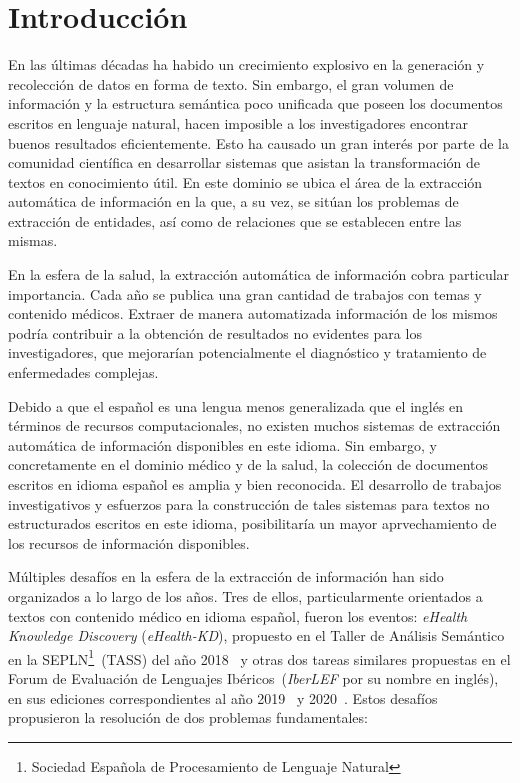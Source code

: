 \chapter*{Introducción}\label{chapter:introduction}

En las últimas décadas ha habido un crecimiento explosivo en la generación y recolección de datos en forma de texto.
Sin embargo, el gran volumen de información y la estructura semántica poco unificada que poseen los documentos escritos en lenguaje natural, hacen imposible a los investigadores encontrar buenos resultados eficientemente.
Esto ha causado un gran interés por parte de la comunidad científica en desarrollar sistemas que asistan la transformación de textos en conocimiento útil.
En este dominio se ubica el área de la extracción automática de información en la que, a su vez, se sitúan los problemas de extracción de entidades, así como de relaciones que se establecen entre las mismas.

En la esfera de la salud, la extracción automática de información cobra particular importancia.
Cada año se publica una gran cantidad de trabajos con temas y contenido médicos.
Extraer de manera automatizada información de los mismos podría contribuir a la obtención de resultados no evidentes para los investigadores, que mejorarían potencialmente el diagnóstico y tratamiento de enfermedades complejas.

Debido a que el español es una lengua menos generalizada que el inglés en términos de recursos computacionales, no existen muchos sistemas de extracción automática de información disponibles en este idioma.
Sin embargo, y concretamente en el dominio médico y de la salud, la colección de documentos escritos en idioma español es amplia y bien reconocida.
El desarrollo de trabajos investigativos y esfuerzos para la construcción de tales sistemas para textos no estructurados escritos en este idioma, posibilitaría un mayor aprvechamiento de los recursos de información disponibles.

Múltiples desafíos en la esfera de la extracción de información han sido organizados a lo largo de los años.
Tres de ellos, particularmente orientados a textos con contenido médico en idioma español, fueron los eventos: \emph{eHealth Knowledge Discovery} (\textit{eHealth-KD}), propuesto en el Taller de Análisis Semántico en la SEPLN\footnote{Sociedad Española de Procesamiento de Lenguaje Natural}~(TASS) del año 2018~\cite{martinez2018overview} y otras dos tareas similares propuestas en el Forum de Evaluación de Lenguajes Ibéricos~(\textit{IberLEF} por su nombre en inglés), en sus ediciones correspondientes al año 2019~\cite{ehealthkd19_overview} y 2020~\cite{ehealthkd20_overview}.
Estos desafíos propusieron la resolución de dos problemas fundamentales:

